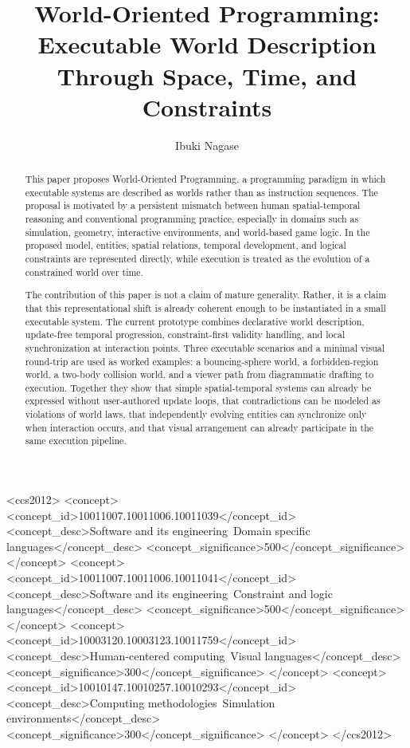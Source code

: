 \documentclass[sigplan]{acmart}
\begin{document}
\title{World-Oriented Programming:\\Executable World Description Through Space, Time, and Constraints}

\author{Ibuki Nagase}

\begin{abstract}
This paper proposes World-Oriented Programming, a programming paradigm in which executable systems are described as worlds rather than as instruction sequences.
The proposal is motivated by a persistent mismatch between human spatial-temporal reasoning and conventional programming practice, especially in domains such as simulation, geometry, interactive environments, and world-based game logic.
In the proposed model, entities, spatial relations, temporal development, and logical constraints are represented directly, while execution is treated as the evolution of a constrained world over time.

The contribution of this paper is not a claim of mature generality.
Rather, it is a claim that this representational shift is already coherent enough to be instantiated in a small executable system.
The current prototype combines declarative world description, update-free temporal progression, constraint-first validity handling, and local synchronization at interaction points.
Three executable scenarios and a minimal visual round-trip are used as worked examples: a bouncing-sphere world, a forbidden-region world, a two-body collision world, and a viewer path from diagrammatic drafting to execution.
Together they show that simple spatial-temporal systems can already be expressed without user-authored update loops, that contradictions can be modeled as violations of world laws, that independently evolving entities can synchronize only when interaction occurs, and that visual arrangement can already participate in the same execution pipeline.
\end{abstract}

\begin{CCSXML}
<ccs2012>
<concept>
<concept_id>10011007.10011006.10011039</concept_id>
<concept_desc>Software and its engineering~Domain specific languages</concept_desc>
<concept_significance>500</concept_significance>
</concept>
<concept>
<concept_id>10011007.10011006.10011041</concept_id>
<concept_desc>Software and its engineering~Constraint and logic languages</concept_desc>
<concept_significance>500</concept_significance>
</concept>
<concept>
<concept_id>10003120.10003123.10011759</concept_id>
<concept_desc>Human-centered computing~Visual languages</concept_desc>
<concept_significance>300</concept_significance>
</concept>
<concept>
<concept_id>10010147.10010257.10010293</concept_id>
<concept_desc>Computing methodologies~Simulation environments</concept_desc>
<concept_significance>300</concept_significance>
</concept>
</ccs2012>
\end{CCSXML}
\end{document}
